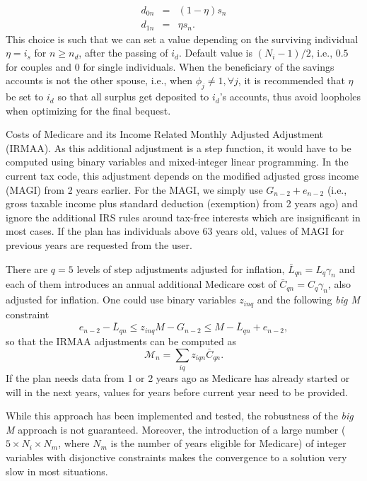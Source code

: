 \documentclass{report}[fleqn,12pt]
\begin{document}
\begin{description}[leftmargin=4em,style=multiline]
	\begin{eqnarray}
		\label{Eq:eta}
		d_{0n} & = & (1 - \eta) s_n \nonumber\\
		d_{1n} & = & \eta s_n.
	\end{eqnarray}
	This choice is such that we can set a value depending on the surviving
	individual $\eta = i_s$ for $n \ge n_d$, after the passing of $i_d$.
	Default value is $(N_i - 1)/2$, i.e., $0.5$ for couples and $0$ for single individuals.
	When the beneficiary of the savings accounts is not the other spouse, i.e., 
	when $\phi_j \neq 1, \forall j$, it is recommended that $\eta$ be set to $i_d$ so that
	all surplus get deposited to $i_d$'s accounts,
	thus avoid loopholes when optimizing for the final bequest.
\item [$\mathcal{M}_n$]
	Costs of Medicare and its Income Related Monthly Adjusted Adjustment (IRMAA).
	As this additional adjustment
	is a step function, it would have to be computed using binary variables and mixed-integer linear
	programming. In the current tax code, this adjustment
	depends on the modified adjusted gross income (MAGI) from 2 years earlier. For the
	MAGI, we simply use $G_{n-2} + e_{n-2}$ (i.e., gross taxable income
	plus standard deduction (exemption) from 2 years ago) and ignore the additional IRS
	rules around tax-free interests which are insignificant in most cases. If the plan
        has individuals above 63 years old, values of MAGI for previous years are requested from the user.

	There are $q=5$ levels
	of step adjustments adjusted for inflation,
	$\bar{L}_{qn} = L_q\gamma_n$ and each of them introduces
	an annual additional Medicare
	cost of $\bar{C}_{qn} = C_q\gamma_n$, also adjusted for inflation.
	One could use binary variables $z_{inq}$ and the following {\em big M} constraint
	\begin{equation}
		e_{n-2} -\bar{L}_{qn} \le z_{inq} M - G_{n-2}
		 \le M - \bar{L}_{qn} + e_{n-2},
	\end{equation}
	so that the IRMAA adjustments can be computed as
	\begin{equation}
		\label{Eq:IRMAA}
		\mathcal{M}_n = \sum_{iq} z_{iqn} \bar{C}_{qn}.
	\end{equation}
	If the plan needs data from 1 or 2 years ago as Medicare has already started or will in the next years,
        values for years before current year need to be provided.

	While this approach has been implemented and tested, the robustness of the {\em big M} approach
	is not guaranteed. Moreover, the introduction of a large number ($5\times N_i\times N_m$,
        where $N_m$ is the number of years eligible for Medicare) of integer variables with
        disjonctive constraints makes the
	convergence to a solution very slow in most situations.


\end{description}
\end{document}

